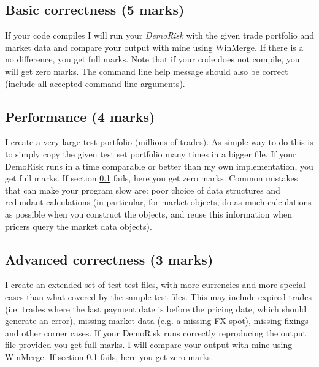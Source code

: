 \documentclass[10pt]{article}
\begin{document}
\subsection{Basic correctness (5 marks)}
\label{sec:correct}
If your code compiles I will run your \textit{DemoRisk} with the given trade portfolio and market data and compare your output with mine using WinMerge. If there is a no difference, you get full marks. Note that if your code does not compile, you will get zero marks. The command line help message should also be correct (include all accepted command line arguments).

\subsection{Performance (4 marks)}
I create a very large test portfolio (millions of trades). As simple way to do this is to simply copy the given test set portfolio many times in a bigger file. If your DemoRisk runs in a time comparable or better than my own implementation, you get full marks. If section \ref{sec:correct} fails, here you get zero marks. Common mistakes that can make your program slow are: poor choice of data structures and redundant calculations (in particular, for market objects, do as much calculations as possible when you construct the objects, and reuse this information when pricers query the market data objects).

\subsection{Advanced correctness (3 marks)}
I create an extended set of test test files, with more currencies and more special cases than what covered by the sample test files. This may include expired trades (i.e. trades where the last payment date is before the pricing date, which should generate an error), missing market data (e.g. a missing FX spot), missing fixings and other corner cases. If your DemoRisk runs correctly reproducing the output file provided you get full marks. I will compare your output with mine using WinMerge. If section \ref{sec:correct} fails, here you get zero marks.
\end{document}
